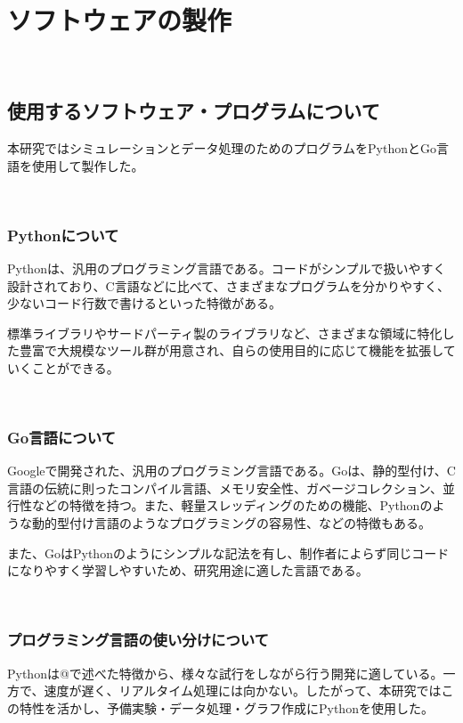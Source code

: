 \chapter{ソフトウェアの製作}\label{software}

\
\section{使用するソフトウェア・プログラムについて}\label{about-program}

本研究ではシミュレーションとデータ処理のためのプログラムをPythonとGo言語を使用して製作した。

\
\subsection{Pythonについて}\label{about-python}

Pythonは、汎用のプログラミング言語である。コードがシンプルで扱いやすく設計されており、C言語などに比べて、さまざまなプログラムを分かりやすく、少ないコード行数で書けるといった特徴がある。

標準ライブラリやサードパーティ製のライブラリなど、さまざまな領域に特化した豊富で大規模なツール群が用意され、自らの使用目的に応じて機能を拡張していくことができる。


\
\subsection{Go言語について}\label{about-go}

Googleで開発された、汎用のプログラミング言語である。Goは、静的型付け、C言語の伝統に則ったコンパイル言語、メモリ安全性、ガベージコレクション、並行性などの特徴を持つ。また、軽量スレッディングのための機能、Pythonのような動的型付け言語のようなプログラミングの容易性、などの特徴もある。

また、GoはPythonのようにシンプルな記法を有し、制作者によらず同じコードになりやすく学習しやすいため、研究用途に適した言語である。

\
\subsection{プログラミング言語の使い分けについて}\label{about-proper-use}

Pythonは@で述べた特徴から、様々な試行をしながら行う開発に適している。一方で、速度が遅く、リアルタイム処理には向かない。したがって、本研究ではこの特性を活かし、予備実験・データ処理・グラフ作成にPythonを使用した。

